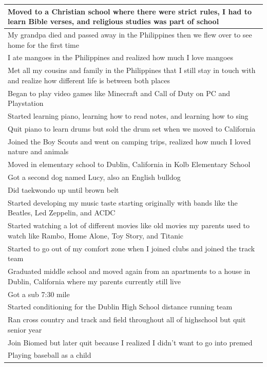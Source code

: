 \documentclass[
  .7em,
  letterpaper,
  DIV=11,
  numbers=noendperiod]{scrartcl}
\begin{document}
\begin{table}
\begin{tabular}{l}
\hline
Moved to a Christian school where there were strict rules, I had to learn Bible verses, and religious studies was part of school\\
\hline
My grandpa died and passed away in the Philippines then we flew over to see home for the first time\\
\hline
I ate mangoes in the Philippines and realized how much I love mangoes\\
\hline
Met all my cousins and family in the Philippines that I still stay in touch with and realize how different life is between both places\\
\hline
Began to play video games like Minecraft and Call of Duty on PC and Playstation\\
\hline
Started learning piano, learning how to read notes, and learning how to sing\\
\hline
Quit piano to learn drums but sold the drum set when we moved to California\\
\hline
Joined the Boy Scouts and went on camping trips, realized how much I loved nature and animals\\
\hline
Moved in elementary school to Dublin, California in Kolb Elementary School\\
\hline
Got a second dog named Lucy, also an English bulldog\\
\hline
Did taekwondo up until brown belt\\
\hline
Started developing my music taste starting originally with bands like the Beatles, Led Zeppelin, and ACDC\\
\hline
Started watching a lot of different movies like old movies my parents used to watch like Rambo, Home Alone, Toy Story, and Titanic\\
\hline
Started to go out of my comfort zone when I joined clubs and joined the track team\\
\hline
Graduated middle school and moved again from an apartments to a house in Dublin, California where my parents currently still live\\
\hline
Got a sub 7:30 mile\\
\hline
Started conditioning for the Dublin High School distance running team\\
\hline
Ran cross country and track and field throughout all of highschool but quit senior year\\
\hline
Join Biomed but later quit because I realized I didn't want to go into premed\\
\hline
Playing baseball as a child\\

\end{tabular}
\end{table}
\end{document}
